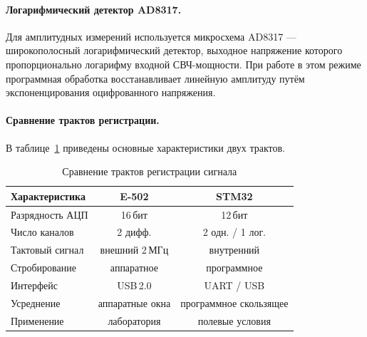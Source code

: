 \paragraph{Логарифмический детектор AD8317.}
Для амплитудных измерений используется микросхема AD8317 --- широкополосный
логарифмический детектор, выходное напряжение которого пропорционально
логарифму входной СВЧ-мощности. При работе в этом режиме программная
обработка восстанавливает линейную амплитуду путём экспоненцирования
оцифрованного напряжения.

\paragraph{Сравнение трактов регистрации.}
В таблице~\ref{tab:adc-compare} приведены основные характеристики двух
трактов.

\begin{table}[H]
\centering
\caption{Сравнение трактов регистрации сигнала}
\label{tab:adc-compare}
\begin{tabular}{l c c}
\toprule
Характеристика & E-502 & STM32 \\
\midrule
Разрядность АЦП & 16\,бит & 12\,бит \\
Число каналов & 2 дифф. & 2 одн. / 1 лог. \\
Тактовый сигнал & внешний 2\,МГц & внутренний \\
Стробирование & аппаратное & программное \\
Интерфейс & USB\,2.0 & UART / USB \\
Усреднение & аппаратные окна & программное скользящее \\
Применение & лаборатория & полевые условия \\
\bottomrule
\end{tabular}
\end{table}
